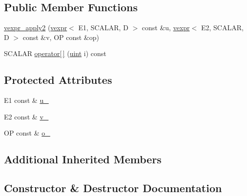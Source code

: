 \subsection*{Public Member Functions}
\begin{DoxyCompactItemize}
\item 
\hyperlink{structmui_1_1vexpr__apply2_a57488d7d3553d9d33bf7759a7060c253}{vexpr\+\_\+apply2} (\hyperlink{structmui_1_1vexpr}{vexpr}$<$ E1, S\+C\+A\+L\+AR, D $>$ const \&u, \hyperlink{structmui_1_1vexpr}{vexpr}$<$ E2, S\+C\+A\+L\+AR, D $>$ const \&v, OP const \&op)
\item 
S\+C\+A\+L\+AR \hyperlink{structmui_1_1vexpr__apply2_a452c46347f57bc03c7e704d2dbc775b3}{operator\mbox{[}$\,$\mbox{]}} (\hyperlink{namespacemui_af15a3e7188a2117fb9965277bb0cacd2}{uint} i) const
\end{DoxyCompactItemize}
\subsection*{Protected Attributes}
\begin{DoxyCompactItemize}
\item 
E1 const  \& \hyperlink{structmui_1_1vexpr__apply2_ae4516b6d3f2cabd1e3df08094237d0cf}{u\+\_\+}
\item 
E2 const  \& \hyperlink{structmui_1_1vexpr__apply2_a57433c09c10b560ce23a382fc49761fc}{v\+\_\+}
\item 
OP const  \& \hyperlink{structmui_1_1vexpr__apply2_ab9ed807ceb0ca2e653322335e107993c}{o\+\_\+}
\end{DoxyCompactItemize}
\subsection*{Additional Inherited Members}


\subsection{Constructor \& Destructor Documentation}
\mbox{\label{structmui_1_1vexpr__apply2_a57488d7d3553d9d33bf7759a7060c253}} 
